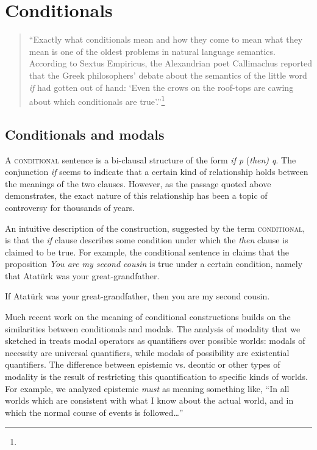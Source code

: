 \chapter{Conditionals}\label{sec:19}

\begin{quote}
“Exactly what conditionals mean and how they come to mean what they mean is one of the oldest problems in natural language semantics. According to Sextus Empiricus, the Alexandrian poet Callimachus reported that the Greek philosophers’ debate about the semantics of the little word \textit{if} had gotten out of hand: ‘Even the crows on the roof-tops are cawing about which conditionals are true’.”\footnote{}
\end{quote}

\section{Conditionals and modals}\label{sec:19.1}

A \textsc{conditional} sentence is a bi-clausal structure of the form \textit{if p} (\textit{then) q}. The conjunction \textit{if} seems to indicate that a certain kind of relationship holds between the meanings of the two clauses. However, as the passage quoted above demonstrates, the exact nature of this relationship has been a topic of controversy for thousands of years.



An intuitive description of the construction, suggested by the term \textsc{conditional}, is that the \textit{if} clause describes some condition under which the \textit{then} clause is claimed to be true. For example, the conditional sentence in  claims that the proposition \textit{You are my second cousin} is true under a certain condition, namely that Atatürk was your great-grandfather.


\ea \label{ex:19.1}
If Atatürk was your great-grandfather, then you are my second cousin.
\z


Much recent work on the meaning of conditional constructions builds on the similarities between conditionals and modals. The analysis of modality that we sketched in  treats modal operators as quantifiers over possible worlds: modals of necessity are universal quantifiers, while modals of possibility are existential quantifiers. The difference between epistemic vs. deontic or other types of modality is the result of restricting this quantification to specific kinds of worlds. For example, we analyzed epistemic \textit{must} as meaning something like, “In all worlds which are consistent with what I know about the actual world, and in which the normal course of events is followed…”



